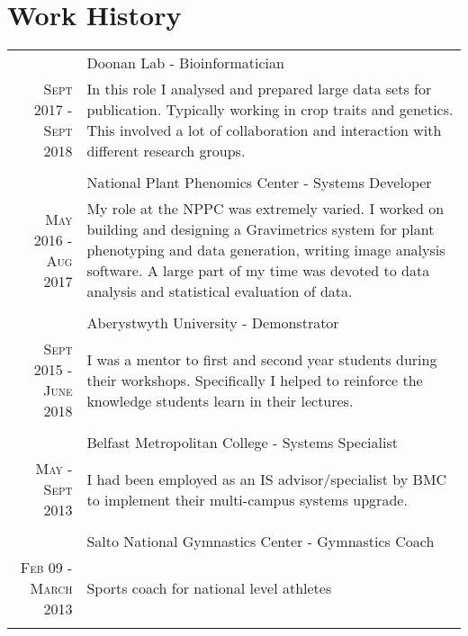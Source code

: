 \documentclass[a4paper,10pt]{article}
\begin{document}
\section{Work History}
  \begin{longtable}{r|p{9cm}}

    &Doonan Lab - Bioinformatician \\\textsc{Sept 2017 - Sept 2018}
    &\footnotesize{In this role I analysed and prepared large data sets for publication. Typically working in crop traits and genetics. This involved a lot of collaboration and interaction with different research groups.}\\\multicolumn{2}{c}{} \\

    &National Plant Phenomics Center -  Systems Developer \\\textsc{May 2016 - Aug 2017}
    &\footnotesize{
      My role at the NPPC was extremely varied. I worked on building and designing a Gravimetrics system for plant phenotyping and data generation, writing image analysis software. A large part of my time was devoted to data analysis and statistical evaluation of data.}\\\multicolumn{2}{c}{} \\


    &Aberystwyth University -  Demonstrator \\ \textsc{Sept 2015 - June 2018}
    &\footnotesize{I was a mentor to first and second year students during their workshops. Specifically I helped to reinforce the knowledge students learn in their lectures.}\\\multicolumn{2}{c}{} \\

    &Belfast Metropolitan College - Systems Specialist \\\textsc{May - Sept 2013}
    &\footnotesize{I had been employed as an IS advisor/specialist by BMC to implement their multi-campus systems upgrade.}\\\multicolumn{2}{c}{} \\

    &Salto National Gymnastics Center - Gymnastics Coach \\\textsc{Feb 09 - March 2013}
     & \footnotesize{Sports coach for national level athletes}\\\multicolumn{2}{c}{} \\
  \end{longtable}
\end{document}
